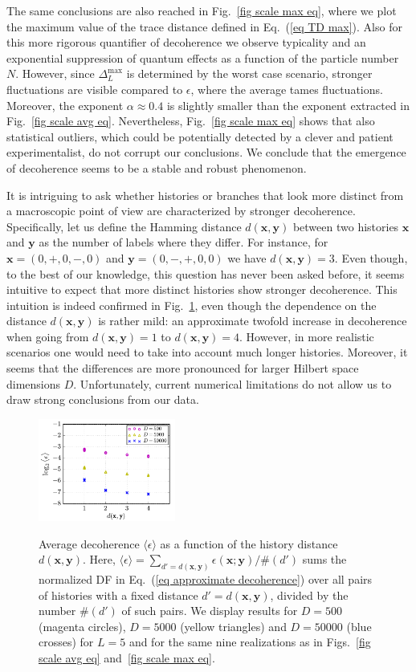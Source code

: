 \documentclass[pre,onecolumn,12pt,aps,longbibliography,nofootinbib]{revtex4-2}
\newcommand{\bb}[1]{\textbf{#1}}
\newcommand{\lr}[1]{{\langle {#1}\rangle}}
\newcommand{\blue}[1]{#1}
\newcommand{\new}[1]{#1}
\begin{document}
The same conclusions are also reached in Fig.~\ref{fig scale max eq}, where we plot the maximum value of the trace
distance defined in Eq.~(\ref{eq TD max}). Also for this more rigorous quantifier of \new{decoherence} we observe
typicality and an exponential suppression of quantum effects as a function of the particle number $N$. However,
since $\Delta_L^\text{max}$ is determined by the worst case scenario, stronger fluctuations are visible compared to
$\epsilon$, where the average tames fluctuations. Moreover, the exponent $\alpha\approx0.4$ is slightly smaller than
the exponent extracted in Fig.~\ref{fig scale avg eq}. Nevertheless, Fig.~\ref{fig scale max eq} shows
that also statistical outliers, which could be potentially detected by a clever and patient experimentalist, do not
corrupt our conclusions. We conclude that the emergence of \new{decoherence} seems to be a stable and robust phenomenon.

\blue{It is intriguing to ask whether histories or branches that look more distinct from a macroscopic point of view are characterized by stronger decoherence. Specifically, let us define the Hamming distance $d(\bb x,\bb y)$ between two histories $\bb x$ and $\bb y$ as the number of labels where they differ. For instance, for $\bb x = (0,+,0,-,0)$ and $\bb y = (0,-,+,0,0)$ we have $d(\bb x,\bb y) = 3$. Even though, to the best of our knowledge, this question has never been asked before, it seems intuitive to expect that more distinct histories show stronger decoherence. This intuition is indeed confirmed in Fig.~\ref{fig distances}, even though the dependence on the distance $d(\bb x,\bb y)$ is rather mild: an approximate twofold increase in decoherence when going from $d(\bb x,\bb y) = 1$ to $d(\bb x,\bb y) = 4$. However, in more realistic scenarios one would need to take into account much longer histories. Moreover, it seems that the differences are more pronounced for larger Hilbert space dimensions $D$. Unfortunately, current numerical limitations do not allow us to draw strong conclusions from our data.}

\begin{figure}[t]
 \centering\includegraphics[width=0.40\textwidth,clip=true]{distances.pdf}
 \label{fig distances}
 \caption{\blue{Average decoherence $\lr{\epsilon}$ as a function of the history distance $d(\bb x,\bb y)$. Here, $\lr{\epsilon} = \sum_{d'=d(\bb x,\bb y)}\epsilon(\bb x;\bb y)/\#(d')$ sums the normalized DF in Eq.~(\ref{eq approximate decoherence}) over all pairs of histories with a fixed distance $d'=d(\bb x,\bb y)$, divided by the number $\#(d')$ of such pairs. We display results for $D=500$ (magenta circles), $D=5000$ (yellow triangles) and $D=50000$ (blue crosses) for $L=5$ and for the same nine realizations as in Figs.~\ref{fig scale avg eq} and~\ref{fig scale max eq}.} }
\end{figure}
\end{document}
